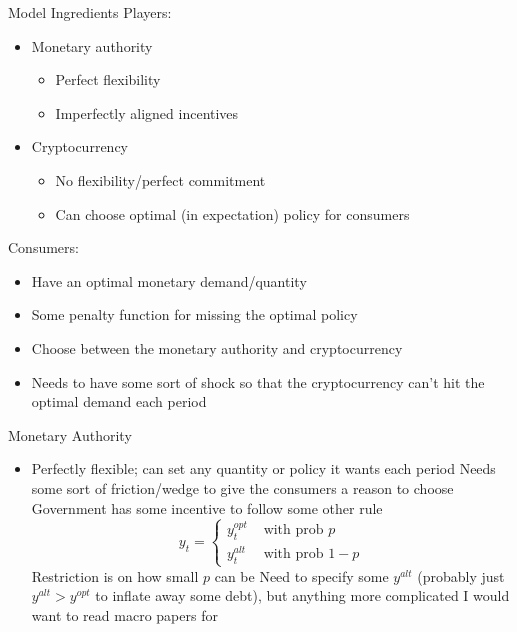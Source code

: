 \documentclass[dvipsnames]{beamer}
\begin{document}
\begin{frame}{Model Ingredients}
 Players:
    \begin{itemize}
    \item Monetary authority
      \begin{itemize}
      \item Perfect flexibility
        \item Imperfectly aligned incentives
        \end{itemize}
      \item Cryptocurrency
        \begin{itemize}
        \item No flexibility/perfect commitment
          \item Can choose optimal (in expectation) policy for consumers 
        \end{itemize}
    \end{itemize}
    \vfill
    Consumers:
    \begin{itemize}
    \item Have an optimal monetary demand/quantity
      \item Some penalty function for missing the optimal policy
      \item Choose between the monetary authority and cryptocurrency
        \item Needs to have some sort of shock so that the cryptocurrency can't hit the optimal demand each period
    \end{itemize}
    \vfill
\end{frame}
%
\begin{frame}{Monetary Authority}
  \begin{itemize}
  \item Perfectly flexible; can set any quantity or policy it wants each period
    \vitem Needs some sort of friction/wedge to give the consumers a reason to choose
\vitem Government has some incentive to follow some other rule
\[
  y_t = \left\{
    \begin{array}{ll}
      y_t^{opt}& \text{ with prob }p\\
      y_t^{alt}& \text{ with prob } 1 - p
    \end{array}
  \right.
\]
\vitem Restriction is on how small $p$ can be
\vitem Need to specify some $y^{alt}$ (probably just $y^{alt} > y^{opt}$ to inflate away some debt), but anything more complicated I would want to read macro papers for
\end{itemize}
\end{frame}
\end{document}
